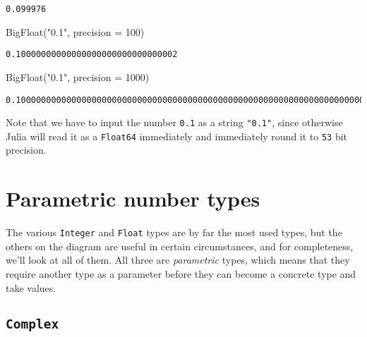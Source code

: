 \documentclass[
  letterpaper,
  DIV=11,
  numbers=noendperiod]{scrreprt}
\newenvironment{Shaded}{\begin{snugshade}}{\end{snugshade}}
\newcommand{\FloatTok}[1]{\textcolor[rgb]{0.68,0.00,0.00}{#1}}
\newcommand{\FunctionTok}[1]{\textcolor[rgb]{0.28,0.35,0.67}{#1}}
\newcommand{\NormalTok}[1]{\textcolor[rgb]{0.00,0.23,0.31}{#1}}
\newcommand{\OperatorTok}[1]{\textcolor[rgb]{0.37,0.37,0.37}{#1}}
\newcommand{\StringTok}[1]{\textcolor[rgb]{0.13,0.47,0.30}{#1}}
\begin{document}
\begin{verbatim}
0.099976
\end{verbatim}

\begin{Shaded}
\begin{Highlighting}[]
\FunctionTok{BigFloat}\NormalTok{(}\StringTok{"0.1"}\NormalTok{, precision }\OperatorTok{=} \FloatTok{100}\NormalTok{)}
\end{Highlighting}
\end{Shaded}

\begin{verbatim}
0.10000000000000000000000000000002
\end{verbatim}

\begin{Shaded}
\begin{Highlighting}[]
\FunctionTok{BigFloat}\NormalTok{(}\StringTok{"0.1"}\NormalTok{, precision }\OperatorTok{=} \FloatTok{1000}\NormalTok{)}
\end{Highlighting}
\end{Shaded}

\begin{verbatim}
0.100000000000000000000000000000000000000000000000000000000000000000000000000000000000000000000000000000000000000000000000000000000000000000000000000000000000000000000000000000000000000000000000000000000000000000000000000000000000000000000000000000000000000000000000000000000000000000000000000000000000002
\end{verbatim}

Note that we have to input the number \texttt{0.1} as a string
\texttt{"0.1"}, since otherwise Julia will read it as a \texttt{Float64}
immediately and immediately round it to \texttt{53} bit precision.

\hypertarget{parametric-number-types}{%
\section{Parametric number types}\label{parametric-number-types}}

The various \texttt{Integer} and \texttt{Float} types are by far the
most used types, but the others on the diagram are useful in certain
circumstances, and for completeness, we'll look at all of them. All
three are \emph{parametric} types, which means that they require another
type as a parameter before they can become a concrete type and take
values.

\hypertarget{complex}{%
\subsection{\texorpdfstring{\texttt{Complex}}{Complex}}\label{complex}}
\end{document}
